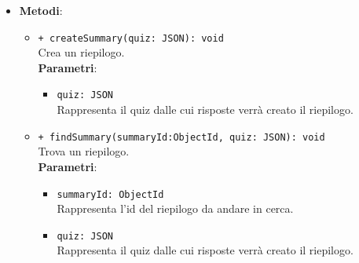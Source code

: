 \begin{itemize}
\begin{itemize}
\begin{itemize}
				\end{itemize}
		\end{itemize}
	\item \textbf{Metodi}:
		\begin{itemize}
			\item \texttt{+ createSummary(quiz: JSON): void}\\
			Crea un riepilogo.\\
			\textbf{Parametri}:
			\begin{itemize}
				\item \texttt{quiz: JSON}\\
				Rappresenta il quiz dalle cui risposte verrà creato il riepilogo.
			\end{itemize}
			\item \texttt{+ findSummary(summaryId:ObjectId, quiz: JSON): void}\\
			Trova un riepilogo.\\
			\textbf{Parametri}:
			\begin{itemize}
				\item \texttt{summaryId: ObjectId}\\
				 Rappresenta l'id del riepilogo da andare in cerca.
				\item \texttt{quiz: JSON}\\
				Rappresenta il quiz dalle cui risposte verrà creato il riepilogo.
			\end{itemize}	
		\end{itemize}
\end{itemize}